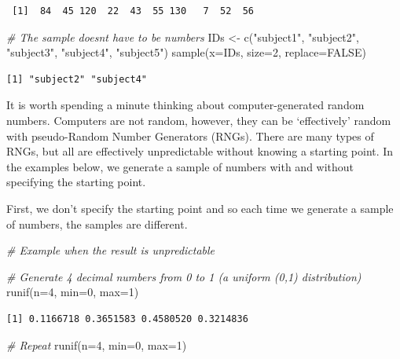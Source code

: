 \documentclass[
  oneside]{krantz}
\newenvironment{Shaded}{\begin{snugshade}}{\end{snugshade}}
\newcommand{\AttributeTok}[1]{\textcolor[rgb]{0.77,0.63,0.00}{#1}}
\newcommand{\CommentTok}[1]{\textcolor[rgb]{0.56,0.35,0.01}{\textit{#1}}}
\newcommand{\ConstantTok}[1]{\textcolor[rgb]{0.00,0.00,0.00}{#1}}
\newcommand{\DecValTok}[1]{\textcolor[rgb]{0.00,0.00,0.81}{#1}}
\newcommand{\FunctionTok}[1]{\textcolor[rgb]{0.00,0.00,0.00}{#1}}
\newcommand{\NormalTok}[1]{#1}
\newcommand{\OtherTok}[1]{\textcolor[rgb]{0.56,0.35,0.01}{#1}}
\newcommand{\StringTok}[1]{\textcolor[rgb]{0.31,0.60,0.02}{#1}}
\begin{document}
\begin{verbatim}
 [1]  84  45 120  22  43  55 130   7  52  56
\end{verbatim}

\begin{Shaded}
\begin{Highlighting}[]
\CommentTok{\# The sample doesn\textquotesingle{}t have to be numbers}
\NormalTok{IDs }\OtherTok{\textless{}{-}} \FunctionTok{c}\NormalTok{(}\StringTok{"subject1"}\NormalTok{, }\StringTok{"subject2"}\NormalTok{, }\StringTok{"subject3"}\NormalTok{, }\StringTok{"subject4"}\NormalTok{, }\StringTok{"subject5"}\NormalTok{)}
\FunctionTok{sample}\NormalTok{(}\AttributeTok{x=}\NormalTok{IDs, }\AttributeTok{size=}\DecValTok{2}\NormalTok{, }\AttributeTok{replace=}\ConstantTok{FALSE}\NormalTok{)}
\end{Highlighting}
\end{Shaded}

\begin{verbatim}
[1] "subject2" "subject4"
\end{verbatim}

It is worth spending a minute thinking about computer-generated random numbers. Computers are not random, however, they can be `effectively' random with pseudo-Random Number Generators (RNGs). There are many types of RNGs, but all are effectively unpredictable without knowing a starting point. In the examples below, we generate a sample of numbers with and without specifying the starting point.

First, we don't specify the starting point and so each time we generate a sample of numbers, the samples are different.

\begin{Shaded}
\begin{Highlighting}[]
\CommentTok{\# Example when the result is unpredictable}

\CommentTok{\# Generate 4 decimal numbers from 0 to 1 (a uniform (0,1) distribution) }
\FunctionTok{runif}\NormalTok{(}\AttributeTok{n=}\DecValTok{4}\NormalTok{, }\AttributeTok{min=}\DecValTok{0}\NormalTok{, }\AttributeTok{max=}\DecValTok{1}\NormalTok{)}
\end{Highlighting}
\end{Shaded}

\begin{verbatim}
[1] 0.1166718 0.3651583 0.4580520 0.3214836
\end{verbatim}

\begin{Shaded}
\begin{Highlighting}[]
\CommentTok{\# Repeat}
\FunctionTok{runif}\NormalTok{(}\AttributeTok{n=}\DecValTok{4}\NormalTok{, }\AttributeTok{min=}\DecValTok{0}\NormalTok{, }\AttributeTok{max=}\DecValTok{1}\NormalTok{)}
\end{Highlighting}
\end{Shaded}
\end{document}
